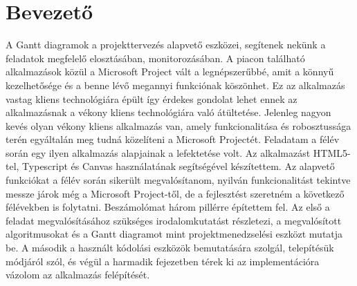 \chapter*{Bevezető}

\hspace{2mm} A Gantt diagramok a projekttervezés alapvető eszközei, segítenek nekünk a feladatok megfelelő elosztásában, monitorozásában. A piacon található alkalmazások közül a Microsoft Project vált a legnépszerűbbé, amit a könnyű kezelhetősége és a benne lévő megannyi funkciónak köszönhet. Ez az alkalmazás vastag kliens technológiára épült így érdekes gondolat lehet ennek az alkalmazásnak a vékony kliens technológiára való átültetése. Jelenleg nagyon kevés olyan vékony kliens alkalmazás van, amely funkcionalitása és robosztussága terén egyáltalán meg tudná közelíteni a Microsoft Projectét. Feladatam a félév során egy ilyen alkalmazás alapjainak a lefektetése volt. Az alkalmazást HTML5-tel, Typescript és Canvas használatának segítségével készítettem.\newline
\indent Az alapvető funkciókat a félév során sikerült megvalósítanom, nyilván funkcionalitást tekintve messze járok még a Microsoft Project-től, de a fejlesztést szeretném a következő félévekben is folytatni. Beszámolómat három pillérre építettem fel. Az első a feladat megvalósításához szükséges irodalomkutatást részletezi, a megvalósított algoritmusokat és a Gantt diagramot mint projektmenedzselési eszközt mutatja be. A második a használt kódolási eszközök bemutatására szolgál, telepítésük módjáról szól, és végül a harmadik fejezetben térek ki az implementációra vázolom az alkalmazás felépítését.
